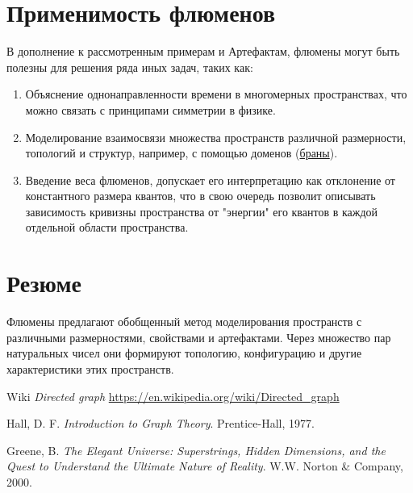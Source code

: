 \documentclass[final]{article}
\begin{document}
    \section{Применимость флюменов}

        В дополнение к рассмотренным примерам и Артефактам, флюмены могут быть 
        полезны для решения ряда иных задач, таких как:

        \begin{enumerate}

            \item Объяснение однонаправленности времени в многомерных 
            пространствах, что можно связать с принципами симметрии в физике.

            \item Моделирование взаимосвязи множества пространств различной 
            размерности, топологий и структур, например, с помощью доменов 
            (\href{https://en.wikipedia.org/wiki/Brane}{браны}).

            \item Введение веса флюменов, допускает его интерпретацию как 
            отклонение от константного размера квантов, что в свою очередь 
            позволит описывать зависимость кривизны пространства от "энергии" 
            его квантов в каждой отдельной области пространства.

        \end{enumerate}

    \section{Резюме}

        Флюмены предлагают обобщенный метод моделирования пространств с 
        различными размерностями, свойствами и артефактами. Через множество пар 
        натуральных чисел они формируют топологию, конфигурацию и другие 
        характеристики этих пространств.

    \begin{thebibliography}{9}

         Wiki
        \textit{Directed graph}
        \url{https://en.wikipedia.org/wiki/Directed_graph}

         Hall, D. F. \textit{Introduction to Graph Theory}.
        Prentice-Hall, 1977.

         Greene, B. \textit{The Elegant Universe:
        Superstrings, Hidden Dimensions, and the Quest to Understand the
        Ultimate Nature of Reality}. W.W. Norton \& Company, 2000.

    \end{thebibliography}
\end{document}

